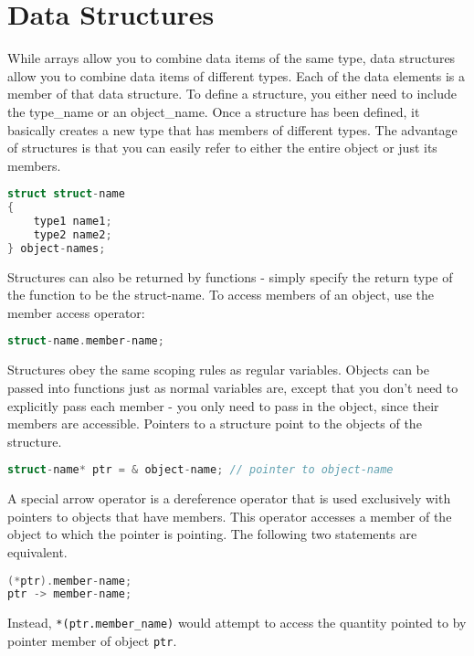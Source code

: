 \documentclass[10pt]{article}
\begin{document}
\section{Data Structures}

While arrays allow you to combine data items of the same type, data structures allow you to combine data items of different types. Each of the data elements is a member of that data structure. To define a structure, you either need to include the type\_name or an object\_name. Once a structure has been defined, it basically creates a new type that has members of different types. The advantage of structures is that you can easily refer to either the entire object or just its members.

\begin{lstlisting}[language=C++]
struct struct-name 
{
    type1 name1;
    type2 name2;
} object-names;
\end{lstlisting}

Structures can also be returned by functions - simply specify the return type of the function to be the struct-name. To access members of an object, use the member access operator:

\begin{lstlisting}[language=C++]
struct-name.member-name;
\end{lstlisting}

Structures obey the same scoping rules as regular variables. Objects can be passed into functions just as normal variables are, except that you don't need to explicitly pass each member - you only need to pass in the object, since their members are accessible. Pointers to a structure point to the objects of the structure. 

\begin{lstlisting}[language=C++]
struct-name* ptr = & object-name; // pointer to object-name
\end{lstlisting}

A special arrow operator is a dereference operator that is used exclusively with pointers to objects that have members. This operator accesses a member of the object to which the pointer is pointing. The following two statements are equivalent.

\begin{lstlisting}[language=C++]
(*ptr).member-name; 
ptr -> member-name;
\end{lstlisting}

Instead, \texttt{*(ptr.member\_name)} would attempt to access the quantity pointed to by pointer member of object \texttt{ptr}.
\end{document}
